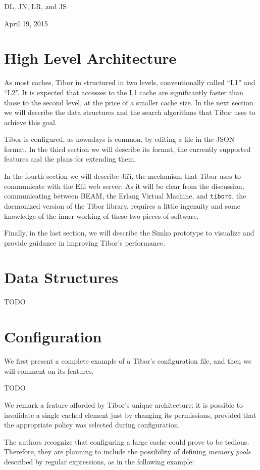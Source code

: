 \documentclass[conference,compsoc]{IEEEtran}
\begin{document}
\hfill DL, JN, LR, and JS
 
\hfill April 19, 2015

\section{High Level Architecture}
As most caches, Tibor in structured in two levels, conventionally called ``L1''
and ``L2''. It is expected that accesses to the L1 cache are significantly
faster than those to the second level, at the price of a smaller cache size.
In the next section we will describe the data structures and the search
algorithms that Tibor uses to achieve this goal.

Tibor is configured, as nowadays is common, by editing a file in the JSON
format. In the third section we will describe its format, the currently
supported features and the plans for extending them.

In the fourth section we will describe Jiří, the mechanism that Tibor uses to
communicate with the Elli web server. As it will be clear from the discussion,
communicating between BEAM, the Erlang Virtual Machine, and \texttt{tibord},
the daemonized version of the Tibor library, requires a little ingenuity and
some knowledge of the inner working of these two pieces of software.

Finally, in the last section, we will describe the Simko prototype to visualize
and provide guidance in improving Tibor's performance.

\section{Data Structures}
TODO

\section{Configuration}
We first present a complete example of a Tibor's configuration file, and then
we will comment on its features.

TODO

We remark a feature afforded by Tibor's unique architecture: it is possible to
invalidate a single cached element just by changing its permissions, provided
that the appropriate policy was selected during configuration.

The authors recognize that configuring a large cache could prove to be tedious.
Therefore, they are planning to include the possibility of defining \emph{memory pools}
described by regular expressions, as in the following example:
\end{document}
